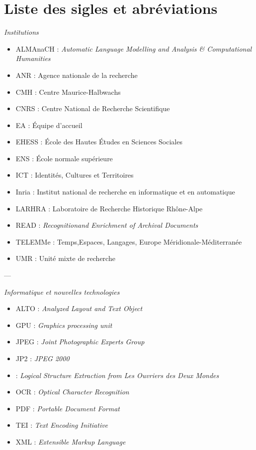 \chapter*{Liste des sigles et abréviations}

\begin{center}
\textit{Institutions}
\end{center} 

\begin{itemize}
    \item ALMAnaCH : \emph{Automatic Language Modelling and Analysis \& Computational Humanities}
    \item ANR : Agence nationale de la recherche
    \item CMH : Centre Maurice-Halbwachs
    \item CNRS : Centre National de Recherche Scientifique
    \item EA : Équipe d'accueil
    \item EHESS : École des Hautes Études en Sciences Sociales
    \item ENS : École normale supérieure
    \item ICT : Identités, Cultures et Territoires
    \item Inria : Institut national de recherche en informatique et en automatique
    \item LARHRA : Laboratoire de Recherche Historique Rhône-Alpe
    \item READ : \emph{Recognitionand Enrichment of Archival Documents}
    \item TELEMMe : Temps,Espaces, Langages, Europe Méridionale-Méditerranée
    \item UMR : Unité mixte de recherche
\end{itemize}

\bigbreak

\begin{center}---

\bigbreak

\textit{Informatique et nouvelles technologies}
\end{center} 

\bigbreak

\begin{itemize}
    \item ALTO : \emph{Analyzed Layout and Text Object}
    \item GPU : \emph{Graphics processing unit}
    \item JPEG : \emph{Joint Photographic Experts Group}
    \item JP2 : \emph{JPEG 2000}
    \item \lse{} : \emph{Logical Structure Extraction from Les Ouvriers des Deux Mondes}
    \item OCR : \emph{Optical Character Recognition}
    \item PDF : \emph{Portable Document Format}
    \item TEI : \emph{Text Encoding Initiative}
    \item XML : \emph{Extensible Markup Language}
\end{itemize}

\clearpage
\thispagestyle{empty}